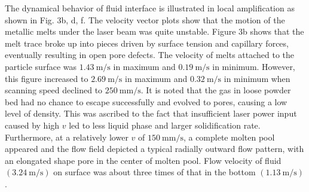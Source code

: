 \documentclass[10pt]{article}
\begin{document}
The dynamical behavior of fluid interface is illustrated in local amplification as shown in Fig. 3b, d, f. The velocity vector plots show that the motion of the metallic melts under the laser beam was quite unstable. Figure 3b shows that the melt trace broke up into pieces driven by surface tension and capillary forces, eventually resulting in open pore defects. The velocity of melts attached to the particle surface was $1.43 \mathrm{~m} / \mathrm{s}$ in maximum and $0.19 \mathrm{~m} / \mathrm{s}$ in minimum. However, this figure increased to $2.69 \mathrm{~m} / \mathrm{s}$ in maximum and $0.32 \mathrm{~m} / \mathrm{s}$ in minimum when scanning speed declined to $250 \mathrm{~mm} / \mathrm{s}$. It is noted that the gas in loose powder bed had no chance to escape successfully and evolved to pores, causing a low level of density. This was ascribed to the fact that insufficient laser power input caused by high $v$ led to less liquid phase and larger solidification rate. Furthermore, at a relatively lower $v$ of $150 \mathrm{~mm} / \mathrm{s}$, a complete molten pool appeared and the flow field depicted a typical radially outward flow pattern, with an elongated shape pore in the center of molten pool. Flow velocity of fluid $(3.24 \mathrm{~m} / \mathrm{s})$ on surface was about three times of that in the bottom $(1.13 \mathrm{~m} / \mathrm{s})$.
\end{document}
